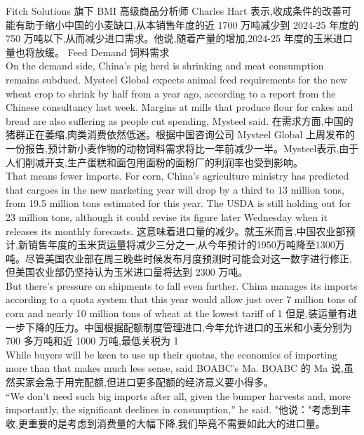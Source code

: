 \documentclass[a4paper,12pt]{article}
\begin{document}
Fitch Solutions 旗下 BMI 高级商品分析师 Charles Hart 表示,收成条件的改善可能有助于缩小中国的小麦缺口,从本销售年度的近 1700 万吨减少到 2024-25 年度的 750 万吨以下,从而减少进口需求。他说,随着产量的增加,2024-25 年度的玉米进口量也将放缓。
Feed Demand 饲料需求
\\On the demand side, China's pig herd is shrinking and meat consumption remains subdued. Mysteel Global expects animal feed requirements for the new wheat crop to shrink by half from a year ago, according to a report from the Chinese consultancy last week. Margins at mills that produce flour for cakes and bread are also suffering as people cut spending, Mysteel said.
在需求方面,中国的猪群正在萎缩,肉类消费依然低迷。根据中国咨询公司 Mysteel Global 上周发布的一份报告,预计新小麦作物的动物饲料需求将比一年前减少一半。Mysteel表示,由于人们削减开支,生产蛋糕和面包用面粉的面粉厂的利润率也受到影响。
\\That means fewer imports. For corn, China's agriculture ministry has predicted that cargoes in the new marketing year will drop by a third to 13 million tons, from 19.5 million tons estimated for this year. The USDA is still holding out for 23 million tons, although it could revise its figure later Wednesday when it releases its monthly forecasts.
这意味着进口量的减少。就玉米而言,中国农业部预计,新销售年度的玉米货运量将减少三分之一,从今年预计的1950万吨降至1300万吨。尽管美国农业部在周三晚些时候发布月度预测时可能会对这一数字进行修正,但美国农业部仍坚持认为玉米进口量将达到 2300 万吨。
\\But there's pressure on shipments to fall even further. China manages its imports according to a quota system that this year would allow just over 7 million tons of corn and nearly 10 million tons of wheat at the lowest tariff of 1%
但是,装运量有进一步下降的压力。中国根据配额制度管理进口,今年允许进口的玉米和小麦分别为 700 多万吨和近 1000 万吨,最低关税为 1%
\\While buyers will be keen to use up their quotas, the economics of importing more than that makes much less sense, said BOABC's Ma.
BOABC 的 Ma 说,虽然买家会急于用完配额,但进口更多配额的经济意义要小得多。
\\“We don't need such big imports after all, given the bumper harvests and, more importantly, the significant declines in consumption,” he said.
"他说："考虑到丰收,更重要的是考虑到消费量的大幅下降,我们毕竟不需要如此大的进口量。
\end{document}

